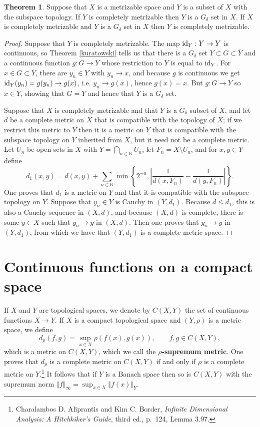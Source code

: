 \documentclass{article}
\newcommand{\id}{\ensuremath\mathrm{id}}
\newcommand{\norm}[1]{\left\Vert #1 \right\Vert}
\theoremstyle{definition}
\newtheorem{theorem}{Theorem}
\theoremstyle{definition}
\begin{document}
\begin{theorem}
Suppose that $X$ is a metrizable space and $Y$ is a subset of $X$ with the subspace topology. If $Y$ 
is completely metrizable then $Y$ is a $G_\delta$ set in $X$. If $X$ is completely metrizable and $Y$ is a $G_\delta$ set in $X$ then
$Y$ is completely metrizable.
\label{Polishsubspace}
\end{theorem}
\begin{proof}
Suppose that $Y$ is completely metrizable. The map $\id_Y:Y \to Y$ is continuous, so Theorem \ref{kuratowski} tells
us that there is a $G_\delta$ set $Y \subset G \subset \overline{Y}$ and a continuous function $g:G \to Y$ whose restriction
to $Y$ is equal to $\id_Y$. For $x \in G \subset \overline{Y}$, there are $y_n \in Y$ with $y_n \to x$, and because
$g$ is continuous we get $\id_Y(y_n)=g(y_n) \to g(x)$,  i.e. $y_n \to g(x)$, hence $g(x)=x$. But $g:G \to Y$ so $x \in Y$, showing
that $G = Y$ and hence that $Y$ is a $G_\delta$ set.

Suppose that $X$ is completely metrizable and that $Y$ is a $G_\delta$ subset of $X$,
and let $d$ be a complete metric
on $X$ that is compatible with the topology of $X$;
if we restrict this metric to $Y$ then it is a metric on $Y$ that is compatible with the subspace topology on $Y$ inherited from $X$,
but it need not be a complete metric.
 Let  $U_n$ be open sets in $X$ with $Y = \bigcap_{n \in \mathbb{N}} U_n$, let
 $F_n = X \setminus U_n$, and for $x,y \in Y$ define
\[
d_1(x,y) = d(x,y)+\sum_{n \in \mathbb{N}} \min\left\{2^{-n},\left| \frac{1}{d(x,F_n)}-\frac{1}{d(y,F_n)} \right| \right\}.
\]
One proves that $d_1$ is a metric on $Y$ and that it is compatible with the subspace topology on $Y$. Suppose that
$y_n \in Y$ is Cauchy in $(Y,d_1)$. Because $d \leq d_1$, this is also a Cauchy sequence in $(X,d)$, and because $(X,d)$
is complete, there is some $y \in X$ such that $y_n \to y$ in $(X,d)$. Then one proves that $y_n \to y$ in $(Y,d_1)$, from which
we have that $(Y,d_1)$ is a complete metric space. 
\end{proof}



\section{Continuous functions on a compact space}
\label{CXY}
If $X$ and $Y$ are topological spaces, we denote by $C(X,Y)$ the set of continuous functions $X \to Y$. 
If $X$ is a compact topological space and $(Y,\rho)$ is a metric space, we define 
\[
d_\rho(f,g) = \sup_{x \in X} \rho(f(x),g(x)), \qquad f,g \in C(X,Y),
\]
which is a metric on $C(X,Y)$, which we call
the \textbf{$\rho$-supremum
metric}. One proves that $d_\rho$ is a complete metric on $C(X,Y)$ if and only if
$\rho$ is a complete metric on $Y$.\footnote{Charalambos D. 
Aliprantis and Kim C. Border, {\em Infinite Dimensional Analysis: A Hitchhiker's Guide}, third ed., p.~124, Lemma 3.97.} 
It follows that if $Y$ is a Banach space then so is $C(X,Y)$ with the supremum norm $\norm{f}_\infty = \sup_{x \in X} \norm{f(x)}_Y$.
\end{document}
